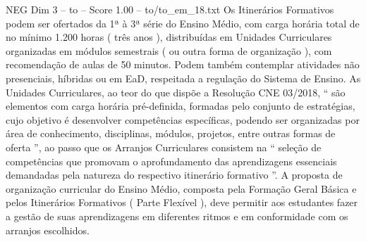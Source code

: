 \begin{textsample}{NEG Dim 3 – to – Score 1.00 – to/to\_em\_18.txt}
Os Itinerários Formativos podem ser ofertados da 1ª à 3ª série do Ensino Médio, com carga horária total de no mínimo 1.200 horas ( três anos ), distribuídas em Unidades Curriculares organizadas em módulos semestrais ( ou outra forma de organização ), com recomendação de aulas de 50 minutos.
Podem também contemplar atividades não presenciais, híbridas ou em EaD, respeitada a regulação do Sistema de Ensino.
As Unidades Curriculares, ao teor do que dispõe a Resolução CNE 03/2018, “ são elementos com carga horária pré-definida, formadas pelo conjunto de estratégias, cujo objetivo é desenvolver competências específicas, podendo ser organizadas por área de conhecimento, disciplinas, módulos, projetos, entre outras formas de oferta ”, ao passo que os Arranjos Curriculares consistem na “ seleção de competências que promovam o aprofundamento das aprendizagens essenciais demandadas pela natureza do respectivo itinerário formativo ”.
A proposta de organização curricular do Ensino Médio, composta pela Formação Geral Básica e pelos Itinerários Formativos ( Parte Flexível ), deve permitir aos estudantes fazer a gestão de suas aprendizagens em diferentes ritmos e em conformidade com os arranjos escolhidos.

\end{textsample}
